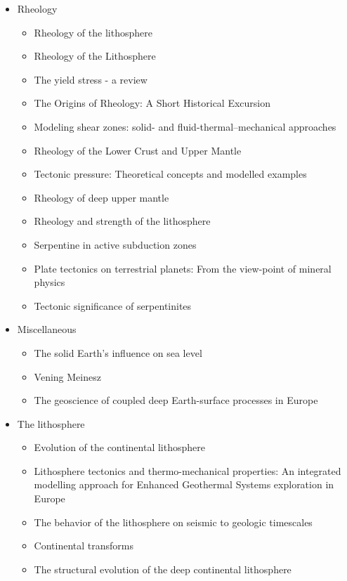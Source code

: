 \begin{itemize}
\item Rheology 
   \begin{itemize}
   \item [\nineteeneightythree] Rheology of the lithosphere \cite{kirb83}
   \item [\nineteeneightyseven] Rheology of the Lithosphere \cite{kikr87} \cite{ramu87}
   \item [\nineteenninetynine] The yield stress - a review \cite{barn99}
   \item [\twothousandtwo] The Origins of Rheology: A Short Historical Excursion \cite{dora02}
   \item [\twothousandthree] Modeling shear zones: solid- and fluid-thermal–mechanical approaches \cite{reyu03}
   \item [\twothousandeight] Rheology of the Lower Crust and Upper Mantle \cite{budr08}
   \item [\twothousandeight] Tectonic pressure: Theoretical concepts and modelled examples \cite{manc08}
   \item [\twothousandten] Rheology of deep upper mantle \cite{kara10}
   \item [\twothousandeleven] Rheology and strength of the lithosphere \cite{buro11}
   \item [\twothousandtwelve] Serpentine in active subduction zones \cite{reyn12}
   \item [\twothousandfourteen] Plate tectonics on terrestrial planets: From the view-point of mineral physics \cite{kara14}
   \item [\twothousandfifteen] Tectonic significance of serpentinites \cite{gusr15}
   \end{itemize}

\item Miscellaneous
   \begin{itemize}
   \item The solid Earth’s influence on sea level \cite{conr13}  
   \item Vening Meinesz \cite{vlaa89}
   \item The geoscience of coupled deep Earth-surface processes in Europe \cite{clzb07}
   \end{itemize}

\item The lithosphere
   \begin{itemize}
   \item [\twothousandfive] Evolution of the continental lithosphere \cite{slee05}
   \item [\twothousandten] Lithosphere tectonics and thermo-mechanical properties: An integrated modelling
         approach for Enhanced Geothermal Systems exploration in Europe \cite{clvz10}
   \item [\twothousandthirteen] The behavior of the lithosphere on seismic to geologic timescales \cite{wazh13}
   \item [\twothousandfourteen] Continental transforms \cite{noto14}
   \item [\twothousandseventeen] The structural evolution of the deep continental lithosphere \cite{comm17}
   \end{itemize}


\end{itemize}
